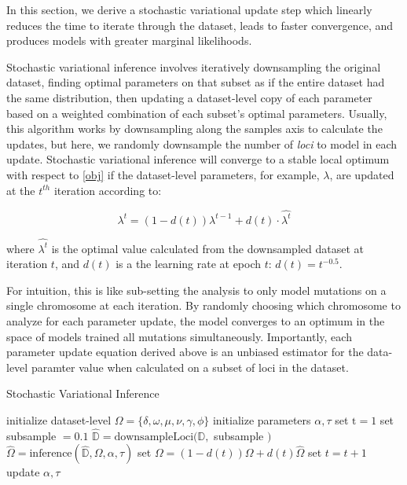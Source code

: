 \documentclass{article}
\begin{document}
In this section, we derive a stochastic variational update step which linearly reduces the time to iterate through the dataset, leads to faster convergence, and produces models with greater marginal likelihoods.

Stochastic variational inference involves iteratively downsampling the original dataset, finding optimal parameters on that subset as if the entire dataset had the same distribution, then updating a dataset-level copy of each parameter based on a weighted combination of each subset's optimal parameters. Usually, this algorithm works by downsampling along the samples axis to calculate the updates, but here, we randomly downsample the number of \emph{loci} to model in each update. Stochastic variational inference will converge to a stable local optimum with respect to \eqref{obj} if the dataset-level parameters, for example, $\lambda$, are updated at the $t^{th}$ iteration according to: 

\begin{equation}
\lambda^t = (1-d(t))\lambda^{t-1} + d(t)\cdot\hat{\lambda^t}
\end{equation}

where $\hat{\lambda^t}$ is the optimal value calculated from the downsampled dataset at iteration $t$, and $d(t)$ is a the learning rate at epoch $t$: $d(t) = t^{-0.5}$. 

For intuition, this is like sub-setting the analysis to only model mutations on a single chromosome at each iteration. By randomly choosing which chromosome to analyze for each parameter update, the model converges to an optimum in the space of models trained all mutations simultaneously. Importantly, each parameter update equation derived above is an unbiased estimator for the data-level paramter value when calculated on a subset of loci in the dataset. 

\begin{algorithm}
\caption{Stochastic Variational Inference}
\begin{algorithmic}
  \scriptsize
  \STATE initialize dataset-level $\Omega = \{\delta, \omega, \mu, \nu, \gamma, \phi\}$
  \STATE initialize parameters $\alpha, \tau$
  \STATE set $\textrm{t}=1$
  \STATE set subsample $=0.1$
  	\STATE $\hat{\mathbb{D}} = \textrm{downsampleLoci}(\mathbb{D}, $ subsample $)$
  	\STATE $\hat{\Omega} = \textrm{inference}(\hat{\mathbb{D}}, \Omega, \alpha, \tau)$ 
  	\STATE set $\Omega = (1-d(t))\Omega + d(t)\hat{\Omega}$
  	\STATE set $t=t+1$
  		\STATE update $\alpha, \tau$
  	\ENDIF
  \ENDWHILE
\end{algorithmic}
\end{algorithm}
\end{document}

